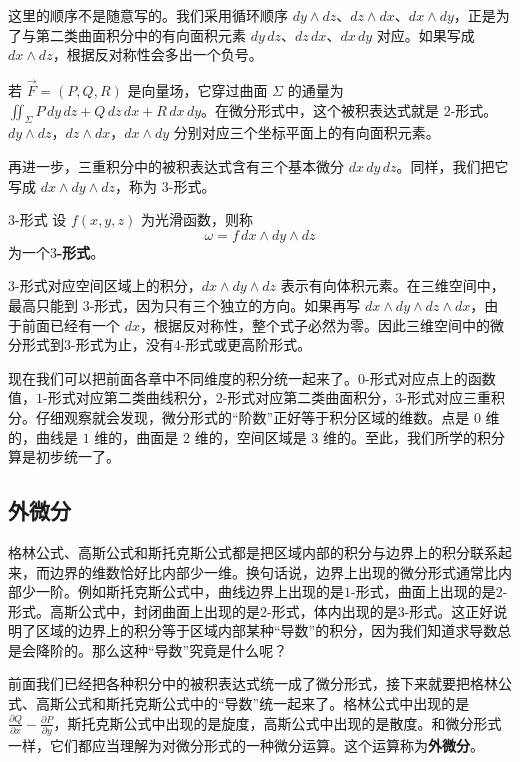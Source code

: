 这里的顺序不是随意写的。我们采用循环顺序 \(dy\wedge dz\)、\(dz\wedge dx\)、\(dx\wedge dy\)，正是为了与第二类曲面积分中的有向面积元素 \(dy\,dz\)、\(dz\,dx\)、\(dx\,dy\) 对应。如果写成 \(dx\wedge dz\)，根据反对称性会多出一个负号。

若 $\vec F=(P,Q,R)$ 是向量场，它穿过曲面 $\Sigma$ 的通量为\(\iint_\Sigma P\,dy\,dz+Q\,dz\,dx+R\,dx\,dy
\)。在微分形式中，这个被积表达式就是 $2$-形式。$dy\wedge dz$，$dz\wedge dx$，$dx\wedge dy$ 分别对应三个坐标平面上的有向面积元素。

再进一步，三重积分中的被积表达式含有三个基本微分 \(dx\,dy\,dz\)。同样，我们把它写成 \(dx\wedge dy\wedge dz\)，称为 $3$-形式。

\begin{definition}{3-形式}{}
设 $f(x,y,z)$ 为光滑函数，则称
\[
\omega=f\,dx\wedge dy\wedge dz
\]
为一个\textbf{$3$-形式}。
\end{definition}

$3$-形式对应空间区域上的积分，$dx\wedge dy\wedge dz$ 表示有向体积元素。在三维空间中，最高只能到 $3$-形式，因为只有三个独立的方向。如果再写 $dx\wedge dy\wedge dz\wedge dx$，由于前面已经有一个 $dx$，根据反对称性，整个式子必然为零。因此三维空间中的微分形式到$3$-形式为止，没有$4$-形式或更高阶形式。

现在我们可以把前面各章中不同维度的积分统一起来了。$0$-形式对应点上的函数值，$1$-形式对应第二类曲线积分，$2$-形式对应第二类曲面积分，$3$-形式对应三重积分。仔细观察就会发现，微分形式的“阶数”正好等于积分区域的维数。点是 $0$ 维的，曲线是 $1$ 维的，曲面是 $2$ 维的，空间区域是 $3$ 维的。至此，我们所学的积分算是初步统一了。

\subsection{外微分}
格林公式、高斯公式和斯托克斯公式都是把区域内部的积分与边界上的积分联系起来，而边界的维数恰好比内部少一维。换句话说，边界上出现的微分形式通常比内部少一阶。例如斯托克斯公式中，曲线边界上出现的是$1$-形式，曲面上出现的是$2$-形式。高斯公式中，封闭曲面上出现的是$2$-形式，体内出现的是$3$-形式。这正好说明了区域的边界上的积分等于区域内部某种“导数”的积分，因为我们知道求导数总是会降阶的。那么这种“导数”究竟是什么呢？

前面我们已经把各种积分中的被积表达式统一成了微分形式，接下来就要把格林公式、高斯公式和斯托克斯公式中的“导数”统一起来了。格林公式中出现的是 \(\frac{\partial Q}{\partial x}-\frac{\partial P}{\partial y}\)，斯托克斯公式中出现的是旋度，高斯公式中出现的是散度。和微分形式一样，它们都应当理解为对微分形式的一种微分运算。这个运算称为\textbf{外微分}。

